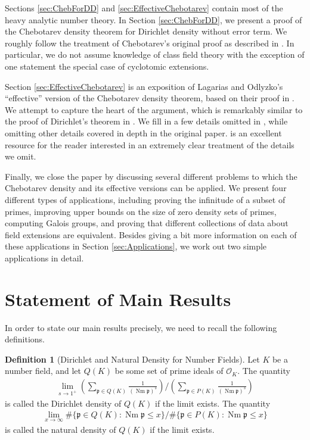 \documentclass[12pt]{amsart}
\theoremstyle{definition}
\newtheorem{definition}[thm]{Definition}
\theoremstyle{remark}
\numberwithin{equation}{section}
\newcommand{\cO}{\mathcal O}
\newcommand{\fkp}{\mathfrak p}
\DeclareMathOperator{\norm}{Nm}
\begin{document}
Sections \ref{sec:ChebForDD} and \ref{sec:EffectiveChebotarev} contain most of the heavy analytic number theory. In Section \ref{sec:ChebForDD}, we present a proof of the Chebotarev density theorem for Dirichlet density  without error term. We roughly follow the treatment of Chebotarev's original proof as described in \cite{FriedJarden08}. In particular, we do not assume knowledge of class field theory with the exception of one statement the special case of cyclotomic extensions.  

Section \ref{sec:EffectiveChebotarev} is an exposition of Lagarias and Odlyzko's  ``effective'' version of the Chebotarev density theorem, based on their proof in \cite{LagariasOdlyzko77}. We attempt to capture the heart of the argument, which is remarkably similar to the proof of Dirichlet's theorem in \cite{Davenport00}. We fill in a few details omitted in \cite{LagariasOdlyzko77}, while omitting other details covered in depth in the original paper. \cite{LagariasOdlyzko77} is an excellent resource for the reader interested in an extremely clear treatment of the details we omit.

Finally, we close the paper by discussing several different problems to which the Chebotarev density and its effective versions can be applied. We present four different types of applications, including proving the infinitude of a subset of primes, improving upper bounds on the size of zero density sets of primes, computing Galois groups, and proving that different collections of data about field extensions are equivalent. Besides giving a bit more information on each of these applications in Section \ref{sec:Applications}, we work out two simple applications in detail. 

\section{Statement of Main Results} \label{sec:MainResults}

In order to state our main results precisely, we need to recall the following definitions.

\begin{definition}[Dirichlet and Natural Density for Number Fields]
Let $K$ be a number field, and let $Q(K)$ be some set of prime ideals of $\cO_{K}$. The quantity 
\begin{align}
\lim_{s \to 1^{+}} \left(\sum_{\fkp \in Q(K)} \frac{1}{(\norm \fkp)^{s}}\right)/\left(\sum_{\fkp \in P(K)} \frac{1}{(\norm \fkp)^{s}}\right)
\end{align}
is called the Dirichlet density of $Q(K)$ if the limit exists. The quantity 
\begin{align}
\lim_{x \to \infty} \#\{\fkp \in Q(K): \norm \fkp \leq x\}/ \#\{\fkp \in P(K): \norm \fkp \leq x\}
\end{align}
is called the natural density of $Q(K)$ if the limit exists.
\end{definition}
\end{document}
